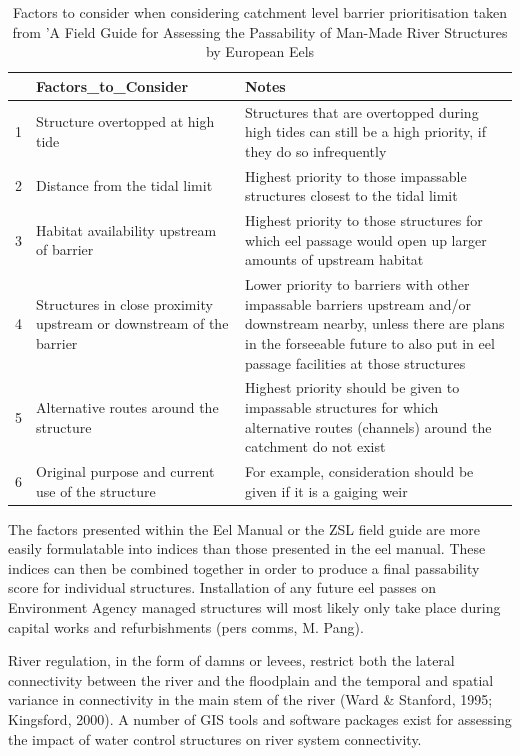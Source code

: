 \documentclass[]{article}
\begin{document}
\begin{table}[t]

\caption{\label{tab:unnamed-chunk-11}Factors to consider when considering catchment level barrier prioritisation taken from 'A Field Guide for Assessing the Passability of Man-Made River Structures by European Eels}
\centering
\begin{tabular}{l|l|l}
\hline
  & Factors\_to\_Consider & Notes\\
\hline
1 & Structure overtopped at high tide & Structures that are overtopped during high tides can still be a high priority, if they do so infrequently\\
\hline
2 & Distance from the tidal limit & Highest priority to those impassable structures closest to the tidal limit\\
\hline
3 & Habitat availability upstream of barrier & Highest priority to those structures for which eel passage would open up larger amounts of upstream habitat\\
\hline
4 & Structures in close proximity upstream or downstream of the barrier & Lower priority to barriers with other impassable barriers upstream and/or downstream nearby, unless there are plans in the forseeable future to also put in eel passage facilities at those structures\\
\hline
5 & Alternative routes around the structure & Highest priority should be given to impassable structures for which alternative routes (channels) around the catchment do not exist\\
\hline
6 & Original purpose and current use of the structure & For example, consideration should be given if it is a gaiging weir\\
\hline
\end{tabular}
\end{table}

The factors presented within the Eel Manual or the ZSL field guide are
more easily formulatable into indices than those presented in the eel
manual. These indices can then be combined together in order to produce
a final passability score for individual structures. Installation of any
future eel passes on Environment Agency managed structures will most
likely only take place during capital works and refurbishments (pers
comms, M. Pang).

River regulation, in the form of damns or levees, restrict both the
lateral connectivity between the river and the floodplain and the
temporal and spatial variance in connectivity in the main stem of the
river (Ward \& Stanford, 1995; Kingsford, 2000). A number of GIS tools
and software packages exist for assessing the impact of water control
structures on river system connectivity.
\end{document}
